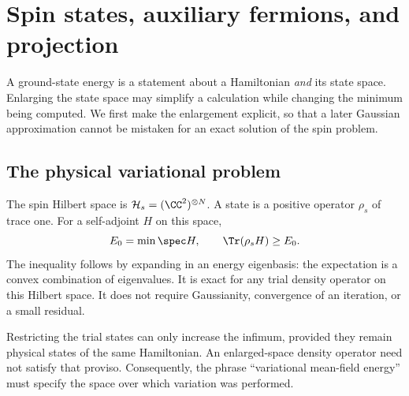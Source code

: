 \chapter{Spin states, auxiliary fermions, and projection}
\label{narr:physical}

A ground-state energy is a statement about a Hamiltonian \emph{and} its state
space. Enlarging the state space may simplify a calculation while changing the
minimum being computed. We first make the enlargement explicit, so that a later
Gaussian approximation cannot be mistaken for an exact solution of the spin
problem.

\section{The physical variational problem}
The spin Hilbert space is $\mathcal H_s=(\CC^2)^{\otimes N}$. A state is a positive
operator $\rho_s$ of trace one. For a self-adjoint $H$ on this space,
\begin{equation}
 E_0=\min\spec H,\qquad \Tr(\rho_s H)\geq E_0.
 \label{eq:narr:variational}
\end{equation}
The inequality follows by expanding in an energy eigenbasis: the expectation
is a convex combination of eigenvalues. It is exact for any trial density
operator on this Hilbert space. It does not require Gaussianity, convergence of
an iteration, or a small residual.

Restricting the trial states can only increase the infimum, provided they remain
physical states of the same Hamiltonian. An enlarged-space density operator
need not satisfy that proviso. Consequently, the phrase ``variational mean-field
energy'' must specify the space over which variation was performed.

